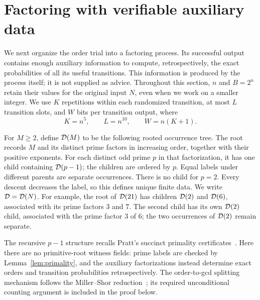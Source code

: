\section{Factoring with verifiable auxiliary data}\label{sec:process}

We next organize the order trial into a factoring process.  Its successful
output contains enough auxiliary information to compute, retrospectively,
the exact probabilities of all its useful transitions.  This information
is produced by the process itself; it is not supplied as advice.
Throughout this section, $n$ and $B=2^n$ retain their values for the original
input $N$, even when we work on a smaller integer.  We use $K$ repetitions
within each randomized transition, at most $L$ transition slots, and $W$
bits per transition output, where
\begin{equation}\label{eq:process-parameters}
 K=n^5,\qquad L=n^{10},\qquad W=n(K+1).
\end{equation}

For $M\ge2$, define $\mathcal D(M)$ to be the following rooted occurrence tree.
The root records $M$ and its distinct prime factors in increasing order,
together with their positive exponents.  For each distinct odd prime $p$ in that factorization, it has one
child containing $\mathcal D(p-1)$; the children are ordered by $p$.  Equal labels
under different parents are separate occurrences.  There is no child for
$p=2$.  Every descent decreases the label, so this defines unique finite
data.  We write $\mathcal D=\mathcal D(N)$.
For example, the root of $\mathcal D(21)$ has children $\mathcal D(2)$ and $\mathcal D(6)$,
associated with its prime factors $3$ and $7$. The second child has its
own $\mathcal D(2)$ child, associated with the prime factor $3$ of $6$; the two
occurrences of $\mathcal D(2)$ remain separate.

The recursive $p-1$ structure recalls Pratt's succinct primality
certificates~\cite{Pratt}. Here there are no primitive-root witness fields:
prime labels are checked by Lemma~\ref{lem:primality}, and the auxiliary
factorizations instead determine exact orders and transition probabilities
retrospectively. The order-to-gcd splitting mechanism follows the
Miller--Shor reduction~\cite{Miller,Shor}; its required unconditional
counting argument is included in the proof below.

